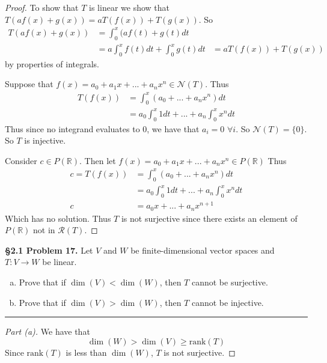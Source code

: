 \documentclass[leqno]{article}
\theoremstyle{nonumberplain}
\newtheorem{proof}{Proof}
\begin{document}
\begin{proof}
To show that $T$ is linear we show that $T(af(x)+g(x))=aT(f(x))+T(g(x))$. So
\begin{align*}
T(af(x)+g(x))&=\int_0^x(af(t)+g(t)dt\\
&=a\int_0^xf(t)dt+\int_0^x g(t)dt
&=aT(f(x))+T(g(x))
\end{align*}
by properties of integrals. 

Suppose that $f(x)=a_0+a_1x+...+a_nx^n\in \mathcal{N}(T)$. Thus
\begin{align*}
T(f(x))&=\int_0^x (a_0+...+a_nx^n)dt\\
&=a_0 \int_0^x 1 dt + ... + a_n \int_0^x x^n dt
\end{align*}
Thus since no integrand evaluates to $0$, we have that $a_i=0$ $\forall i$. So $\mathcal{N}(T)=\{0\}$. So $T$ is injective.

Consider $c\in P(\mathbb{R})$. Then let $f(x)=a_0+a_1x+...+a_nx^n \in P(\mathbb{R})$ Thus
\begin{align*}
c=T(f(x))&=\int_0^x (a_0+...+a_nx^n)dt\\
&=a_0 \int_0^x 1 dt + ... + a_n \int_0^x x^n dt\\
c&=a_0x+...+a_nx^{n+1}
\end{align*}
Which has no solution.  Thus $T$ is not surjective since there exists an element of $P(\mathbb{R})$ not in $\mathcal{R}(T)$.
\end{proof}

\pagebreak




\noindent\textbf{\S 2.1 Problem 17.} Let $V$ and $W$ be finite-dimensional vector spaces and $T\colon V \to W$ be linear.
\begin{enumerate}[(a)]
\item Prove that if $\dim(V)<\dim(W)$, then $T$ cannot be surjective.
\item Prove that if $\dim(V)>\dim(W)$, then $T$ cannot be injective.
\end{enumerate}

\noindent\rule[0.5ex]{\linewidth}{1pt}

\begin{proof}[Part (a)]
We have that
\[
\dim(W)>\dim(V)\geq \textrm{rank}(T)
\]
Since $\textrm{rank}(T)$ is less than $\dim(W)$, $T$ is not surjective.
\end{proof}
\end{document}
